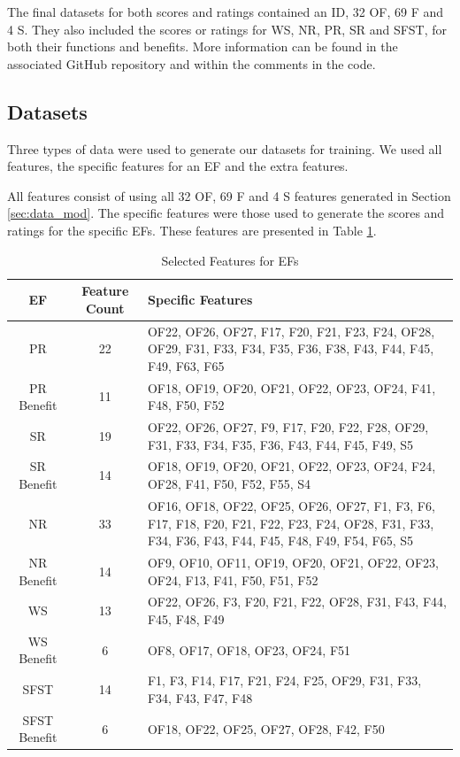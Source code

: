 \documentclass[12pt,letterpaper]{article}
\begin{document}
The final datasets for both scores and ratings contained an ID, 32 \ac{OF}, 69 \ac{F} and 4 \ac{S}.
They also included the scores or ratings for \ac{WS}, \ac{NR}, \ac{PR}, \ac{SR} and \ac{SFST}, for both their functions and benefits.
More information can be found in the associated GitHub repository and within the comments in the code.

\subsection{Datasets}
Three types of data were used to generate our datasets for training.
We used all features, the specific features for an \ac{EF} and the extra features.

All features consist of using all 32 OF, 69 F and 4 S features generated in Section \ref{sec:data_mod}.
The specific features were those used to generate the scores and ratings for the specific \acp{EF}.
These features are presented in Table \ref{tab:data_spec_features}.

\begin{table}[h]
    \centering
    \begin{tabular}{|c|c|m{8cm}|}
        \hline
        \textbf{EF} & \textbf{Feature Count} & \textbf{Specific Features} \\
        \hline
       \ac{PR} & 22 & OF22, OF26, OF27, F17, F20, F21, F23, F24, OF28, OF29, F31, F33, F34, F35, F36, F38, F43, F44, F45, F49, F63, F65 \\
        \hline
       \ac{PR} Benefit & 11 & OF18, OF19, OF20, OF21, OF22, OF23, OF24, F41, F48, F50, F52 \\
        \hline
       \ac{SR} & 19 & OF22, OF26, OF27, F9, F17, F20, F22, F28, OF29, F31, F33, F34, F35, F36, F43, F44, F45, F49, S5 \\
        \hline
       \ac{SR} Benefit & 14 & OF18, OF19, OF20, OF21, OF22, OF23, OF24, F24, OF28, F41, F50, F52, F55, S4 \\
        \hline
       \ac{NR} & 33 & OF16, OF18, OF22, OF25, OF26, OF27, F1, F3, F6, F17, F18, F20, F21, F22, F23, F24, OF28, F31, F33, F34, F36, F43, F44, F45, F48, F49, F54, F65, S5 \\
        \hline
       \ac{NR} Benefit & 14 & OF9, OF10, OF11, OF19, OF20, OF21, OF22, OF23, OF24, F13, F41, F50, F51, F52 \\
        \hline
       \ac{WS} & 13 & OF22, OF26, F3, F20, F21, F22, OF28, F31, F43, F44, F45, F48, F49 \\
        \hline
       \ac{WS} Benefit & 6 & OF8, OF17, OF18, OF23, OF24, F51 \\
        \hline
       \ac{SFST} & 14 & F1, F3, F14, F17, F21, F24, F25, OF29, F31, F33, F34, F43, F47, F48 \\
        \hline
       \ac{SFST} Benefit & 6 & OF18, OF22, OF25, OF27, OF28, F42, F50 \\
        \hline
    \end{tabular}
    \caption{Selected Features for EFs}
    \label{tab:data_spec_features}
\end{table}
\end{document}
